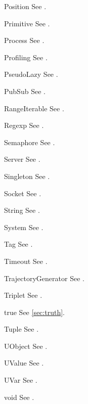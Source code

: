 \begin{urbiscriptapi}
\item[Position] See .
\item[Primitive] See .
\item[Process] See .
\item[Profiling] See .
\item[PseudoLazy] See .
\item[PubSub] See .
\item[RangeIterable] See .
\item[Regexp] See .
\item[Semaphore] See .
\item[Server] See .
\item[Singleton] See .
\item[Socket] See .
\item[String] See .
\item[System] See .
\item[Tag] See .
\item[Timeout] See .
\item[TrajectoryGenerator] See .
\item[Triplet] See .
\item[true]  See \autoref{sec:truth}.
\item[Tuple] See .
\item[UObject] See .

\item[UValue] See .

\item[UVar] See .
\item[void] See .
\end{urbiscriptapi}


